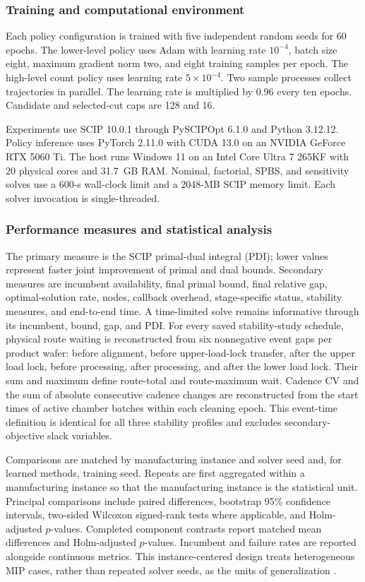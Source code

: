 \documentclass[preprint,12pt,authoryear]{elsarticle}
\begin{document}
\subsubsection{Training and computational environment}

Each policy configuration is trained with five independent random seeds for
60 epochs. The lower-level policy uses Adam with learning rate $10^{-4}$,
batch size eight, maximum gradient norm two, and eight training samples per
epoch. The high-level count policy uses learning rate $5\times10^{-4}$. Two
sample processes collect trajectories in parallel. The learning rate is
multiplied by 0.96 every ten epochs. Candidate and selected-cut caps are 128
and 16.

Experiments use SCIP 10.0.1 through PySCIPOpt 6.1.0 and Python 3.12.12.
Policy inference uses PyTorch 2.11.0 with CUDA 13.0 on an NVIDIA GeForce RTX
5060 Ti. The host runs Windows 11 on an Intel Core Ultra 7 265KF with 20
physical cores and 31.7~GB RAM. Nominal, factorial, SPBS, and sensitivity
solves use a 600-s wall-clock limit and a 2048-MB SCIP memory limit. Each
solver invocation is single-threaded.

\subsubsection{Performance measures and statistical analysis}

The primary measure is the SCIP primal-dual integral (PDI); lower values
represent faster joint improvement of primal and dual bounds. Secondary
measures are incumbent availability, final primal bound, final relative gap,
optimal-solution rate, nodes, callback overhead,
stage-specific status, stability measures, and end-to-end time. A time-limited
solve remains informative through its incumbent, bound, gap, and PDI.
For every saved stability-study schedule, physical route waiting is
reconstructed from six nonnegative event gaps per product wafer: before
alignment, before upper-load-lock transfer, after the upper load lock, before
processing, after processing, and after the lower load lock. Their sum and
maximum define route-total and route-maximum wait. Cadence CV and the sum of
absolute consecutive cadence changes are reconstructed from the start times of
active chamber batches within each cleaning epoch. This event-time definition
is identical for all three stability profiles and excludes secondary-objective
slack variables.

Comparisons are matched by manufacturing instance and solver seed and, for
learned methods, training seed. Repeats are first aggregated within a
manufacturing instance so that the manufacturing instance is the statistical
unit. Principal comparisons include paired differences, bootstrap 95\%
confidence intervals, two-sided Wilcoxon signed-rank tests where applicable,
and Holm-adjusted $p$-values. Completed component contrasts report matched
mean differences and Holm-adjusted $p$-values. Incumbent and failure rates are
reported alongside continuous metrics. This instance-centered design treats
heterogeneous MIP cases, rather than repeated solver seeds, as the units of
generalization \citep{gleixner2021miplib}.
\end{document}
